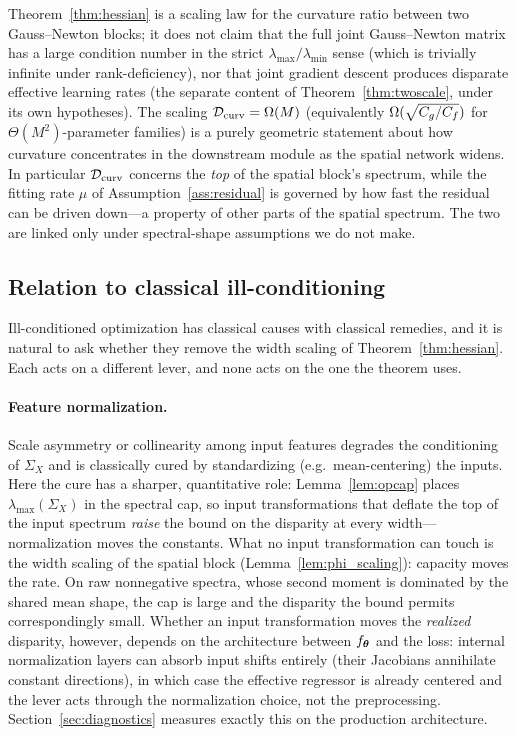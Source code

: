 \begin{remark}
\label{rem:thm1_scope}
Theorem~\ref{thm:hessian} is a scaling law for the curvature ratio between
two Gauss--Newton blocks; it does not claim that the full joint
Gauss--Newton matrix has a large condition number in the strict
$\lambda_{\max}/\lambda_{\min}$ sense (which is trivially infinite under
rank-deficiency), nor that joint gradient descent produces disparate
effective learning rates (the separate content of
Theorem~\ref{thm:twoscale}, under its own hypotheses). The scaling
$\mathcal{D}_{\mathrm{curv}} = \Omega(M)$ (equivalently $\Omega(\sqrt{C_g / C_f})$ for
$\Theta(M^2)$-parameter families) is a purely geometric statement about how
curvature concentrates in the downstream module as the spatial network
widens. In particular $\mathcal{D}_{\mathrm{curv}}$ concerns the \emph{top} of the spatial
block's spectrum, while the fitting rate $\mu$ of
Assumption~\ref{ass:residual} is governed by how fast the residual can be
driven down---a property of other parts of the spatial spectrum. The two are
linked only under spectral-shape assumptions we do not make.
\end{remark}

\subsection{Relation to classical ill-conditioning}
\label{app:classical}

Ill-conditioned optimization has classical causes with classical remedies,
and it is natural to ask whether they remove the width scaling of
Theorem~\ref{thm:hessian}. Each acts on a different lever, and none acts on
the one the theorem uses.

\paragraph{Feature normalization.}
Scale asymmetry or collinearity among input features degrades the
conditioning of $\Sigma_X$ and is classically cured by standardizing (e.g.\
mean-centering) the inputs. Here the cure has a sharper, quantitative role:
Lemma~\ref{lem:opcap} places $\lambda_{\max}(\Sigma_X)$ in the spectral cap,
so input transformations that deflate the top of the input spectrum
\emph{raise} the bound on the disparity at every width---normalization moves
the constants. What no input transformation can touch is the width scaling
of the spatial block (Lemma~\ref{lem:phi_scaling}): capacity moves the rate.
On raw nonnegative spectra, whose second moment is dominated by the shared
mean shape, the cap is large and the disparity the bound permits
correspondingly small. Whether an input transformation moves the
\emph{realized} disparity, however, depends on the architecture between
$f_{\boldsymbol{\theta}}$ and the loss: internal normalization layers can absorb input
shifts entirely (their Jacobians annihilate constant directions), in which
case the effective regressor is already centered and the lever acts through
the normalization choice, not the preprocessing. Section~\ref{sec:diagnostics}
measures exactly this on the production architecture.

